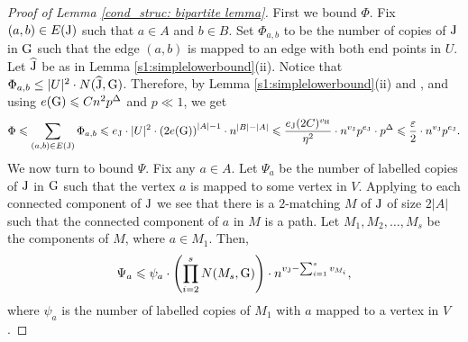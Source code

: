 \documentclass[a4paper,11pt,english,reqno]{amsart}
\numberwithin{equation}{section}
\renewcommand{\leq}{\leqslant}
\newcommand{\tu}[1]{\textup{#1}}
\begin{document}
\begin{proof}[Proof of Lemma \ref{cond_struc: bipartite lemma}]
				First we bound $\Phi$. Fix $(a,b)\in E(\tu{J})$ such that $a\in A$ and $b\in B$. Set $\Phi_{a,b}$ to be the number of copies of $\tu{J}$ in $\tu{G}$ such that the edge $(a,b)$ is mapped to an edge with both end points in $U$. Let 
				$\widehat{\tu{J}}$ be as in Lemma \ref{s1:simplelowerbound}(ii). Notice that $\Phi_{a,b} \le |U|^{2}\cdot N(\widehat{\tu{J}}, \tu{G})$.
				Therefore, by Lemma \ref{s1:simplelowerbound}(ii) and \cite[Theorem~5.4]{HMS}, and using $e(\tu{G})\leq Cn^{2}p^{\Delta}$ and $p\ll1 $, we get
				\begin{equation}
					\label{bound cond Phi}
					\Phi \leq \sum_{(a,b) \in E(\tu{J})} \Phi_{a,b}  \leq e_{\tu{J}}\cdot |U|^{2}\cdot \left(2e(\tu{G})\right)^{|A|-1}\cdot n^{|B|-|A|}\leq \frac{e_{\tu{J}}(2C)^{v_{\tu{H}}}}{\eta^{2}}\cdot n^{v_{\tu{J}}}p^{e_{\tu{J}}}\cdot p^{\Delta} \leq \frac{\varepsilon}{2} \cdot n^{v_{\tu{J}}}p^{e_{\tu{J}}}.
				\end{equation}
				We now turn to bound $\Psi$. Fix any $a\in A$. Let $\Psi_{a}$  be the number of labelled copies of $\tu{J}$ in $\tu{G}$ such that the vertex $a$ is mapped to some vertex in $V$. Applying \cite[Lemma~7.1]{BGLZ} to each connected component of $\tu{J}$ we see that there is a $2$-matching $M$ of $\tu{J}$ of size $2|A|$ such that the connected component of $a$ in $M$ is a path. Let $M_{1}, M_{2}, \ldots, M_{s}$ be the components of $M$, where $a\in M_{1}$. Then,
				\begin{equation}
					\label{cond_struc: 2-matching split}
					\Psi_{a}\leq \psi_{a} \cdot \left(\prod_{i=2}^{s} N(M_{s}, \tu{G})\right) \cdot n^{v_{\tu{J}}-\sum_{i=1}^{s} v_{M_{i}}},  
				\end{equation}
				where $\psi_{a}$ is the number of labelled copies of $M_{1}$ with $a$ mapped to a vertex in $V$. 
				

\end{proof}
\end{document}
